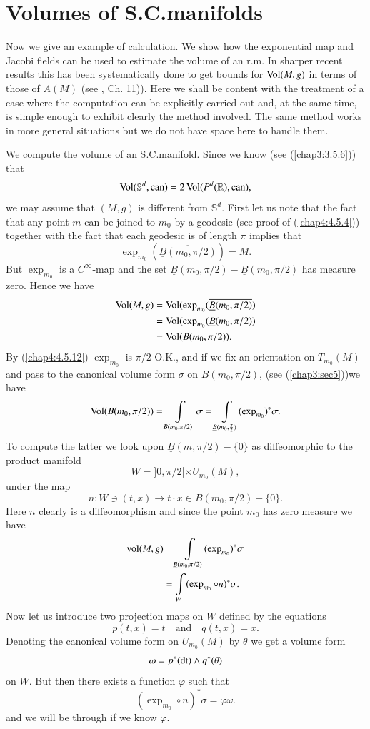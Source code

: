 \section{Volumes of S.C.\@ manifolds}\label{chap6:sec7}

Now we give an example of calculation. We show how the exponential map
and Jacobi fields can be used to estimate the volume of an r.m. In
sharper recent results this has been systematically done to get bounds
for $\operatorname{Vol}(M,g)$ in terms of those of $A(M)$ (see \cite{33},
Ch. 11)). Here we shall be content with the treatment of a case where
the computation can be explicitly carried out and, at the same time,
is simple enough \pageoriginale to exhibit clearly the method
involved. The same method works in more general situations but we do
not have space here to handle them.

We compute the volume of an S.C.\@ manifold. Since we know (see
(\ref{chap3:3.5.6})) that 
$$
\operatorname{Vol}(\mathbb{S}^{d},\operatorname{can})=2\operatorname{Vol}(P^{d}(\mathbb{R}),\operatorname{can}),
$$
we may assume that $(M,g)$ is different from $\mathbb{S}^{d}$. First
let us note that the fact that any point $m$ can be joined to $m_{0}$
by a geodesic (see proof of (\ref{chap4:4.5.4})) together with the fact
that each geodesic is of length $\pi$ implies that 
$$
\exp_{m_{0}}(\overline{\underline{B}(m_{0},\pi/2)})=M.
$$
But $\exp_{m_{0}}$ is a $C^{\infty}$-map and the set
$\overline{\underline{B}(m_{0},\pi/2)}-\underline{B}(m_{0},\pi/2)$ has
measure zero. Hence we have
\begin{align*}
\operatorname{Vol}(M,g) &=
\operatorname{Vol}(\exp_{m_{0}}(\overline{\underline{B}(m_{0},\pi/2)})\\
&= \operatorname{Vol}(\exp_{m_{0}}(\underline{B}(m_{0},\pi/2))\\
&= \operatorname{Vol}(B(m_{0},\pi/2)).
\end{align*}
By (\ref{chap4:4.5.12}) $\exp_{m_{0}}$ is $\pi/2$-O.K., and if we fix an
orientation on $T_{m_{0}}(M)$ and pass to the canonical volume form
$\sigma$ on $B(m_{0},\pi/2)$, (see (\ref{chap3:sec5}))we have
$$
\operatorname{Vol}(B(m_{0},\pi/2))=\int\limits_{B(m_{0},\pi/2)}\sigma=\int\limits_{\underline{B}(m_{0},\frac{\pi}{2})}(\exp_{m_{0}})^{\ast}\sigma.
$$
To \pageoriginale compute the latter we look upon
$\underline{B}(m,\pi/2)-\{0\}$ as 
diffeomorphic to the product manifold
$$
W=]0, \pi/2[\times U_{m_{0}}(M),
$$
under the map
$$
n:W\ni (t,x)\to t\cdot x\in \underline{B}(m_{0},\pi/2)-\{0\}.
$$
Here $n$ clearly is a diffeomorphism and since the point $m_{0}$ has
zero measure we have
\begin{align*}
\operatorname{vol}(M,g) &=
\int\limits_{\underline{B}(m_{0},\pi/2)}(\exp_{m_{0}})^{\ast}\sigma\\
          &= \int\limits_{W}(\exp_{m_{0}}\circ n)^{\ast}\sigma.
\end{align*}
Now let us introduce two projection maps on $W$ defined by the
equations
$$
p(t,x)=t\quad\text{and}\quad q(t,x)=x.
$$
Denoting the canonical volume form on $U_{m_{0}}(M)$ by $\theta$ we
get a volume form
$$
\omega=p^{\ast}(\operatorname{dt})\wedge q^{\ast}(\theta)
$$
on $W$. But then there exists a function $\varphi$ such that
$$
(\exp_{m_{0}}\circ n)^{\ast}\sigma=\varphi\omega.
$$
and we will be through if we know $\varphi$.

